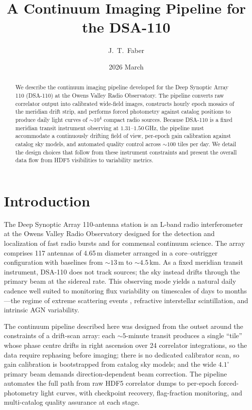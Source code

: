 \documentclass[twocolumn,11pt]{article}
\title{A Continuum Imaging Pipeline for the DSA-110}
\author{J.~T.~Faber}
\date{2026 March}
\newcommand{\dsa}{DSA-110\xspace}
\begin{document}
\maketitle

\begin{abstract}
We describe the continuum imaging pipeline developed for the Deep Synoptic
Array 110 (\dsa) at the Owens Valley Radio Observatory.  The
pipeline converts raw correlator output into calibrated wide-field images,
constructs hourly epoch mosaics of the meridian drift strip, and performs
forced photometry against catalog positions to produce daily light curves
of $\sim\!10^{4}$ compact radio sources.  Because \dsa is a fixed meridian
transit instrument observing at $1.31$--$1.50$\,GHz, the pipeline must
accommodate a continuously drifting field of view, per-epoch gain
calibration against catalog sky models, and automated quality control
across $\sim\!100$ tiles per day.  We detail the design choices that follow
from these instrument constraints and present the overall data flow from
HDF5 visibilities to variability metrics.
\end{abstract}


\section{Introduction}\label{sec:intro}

The Deep Synoptic Array 110-antenna station \citep[\dsa;][]{hallinan2019}
is an L-band radio interferometer at the Owens Valley Radio Observatory
designed for the detection and localization of fast radio bursts and for
commensal continuum science.  The array comprises 117 antennas of 4.65\,m
diameter arranged in a core--outrigger configuration with baselines
from $\sim\!13$\,m to $\sim\!4.5$\,km.  As a fixed meridian transit instrument,
\dsa does not track sources; the sky instead drifts through the primary
beam at the sidereal rate.  This observing mode yields a natural daily
cadence well suited to monitoring flux variability on timescales of days
to months---the regime of extreme scattering events
\citep[ESEs;][]{fiedler1987}, refractive interstellar scintillation, and
intrinsic AGN variability.

The continuum pipeline described here was designed from the outset around
the constraints of a drift-scan array: each $\sim\!5$-minute transit
produces a single ``tile'' whose phase centre drifts in right ascension
over 24 correlator integrations, so the data require rephasing before
imaging; there is no dedicated calibrator scan, so gain calibration is
bootstrapped from catalog sky models; and the wide $4.1^{\circ}$ primary
beam demands direction-dependent beam correction.  The pipeline
automates the full path from raw HDF5 correlator dumps to per-epoch
forced-photometry light curves, with checkpoint recovery, flag-fraction
monitoring, and multi-catalog quality assurance at each stage.
\end{document}
